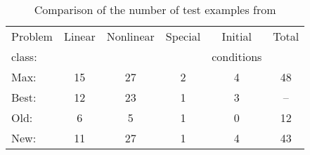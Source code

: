 \documentclass{article}
\begin{document}
\begin{table}[hbtp]\centering
  \begin{tabular}{lccccc}
    \hline
    Problem & Linear & Nonlinear & Special & Initial & Total \\
    class:  &        &           &         & conditions \\
    \hline
    Max:  & 15 & 27 & 2 & 4 & 48 \\
    Best: & 12 & 23 & 1 & 3 & -- \\
    Old:  &  6 &  5 & 1 & 0 & 12 \\
    New:  & 11 & 27 & 1 & 4 & 43 \\
    \hline
  \end{tabular}
  \caption{Comparison of the number of test examples from}
\end{table}
\end{document}
